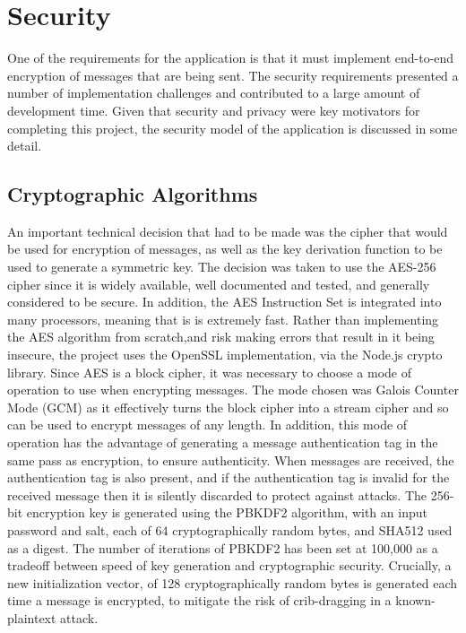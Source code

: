 \section{Security}
One of the requirements for the application is that it must implement end-to-end encryption of messages that are being sent. The security requirements presented a number of implementation challenges and contributed to a large amount of development time. Given that security and privacy were key motivators for completing this project, the security model of the application is discussed in some detail.

\subsection{Cryptographic Algorithms}
An important technical decision that had to be made was the cipher that would be used for encryption of messages, as well as the key derivation function to be used to generate a symmetric key. The decision was taken to use the AES-256 cipher since it is widely available, well documented and tested, and generally considered to be secure. In addition, the AES Instruction Set is integrated into many processors, meaning that is is extremely fast. Rather than implementing the AES algorithm from scratch,and risk making errors that result in it being insecure, the project uses the OpenSSL implementation, via the Node.js crypto library. Since AES is a block cipher, it was necessary to choose a mode of operation to use when encrypting messages. The mode chosen was Galois Counter Mode (GCM) as it effectively turns the block cipher into a stream cipher and so can be used to encrypt messages of any length. In addition, this mode of operation has the advantage of generating a message authentication tag in the same pass as encryption, to ensure authenticity. When messages are received, the authentication tag is also present, and if the authentication tag is invalid for the received message then it is silently discarded to protect against attacks. The 256-bit encryption key is generated using the PBKDF2 algorithm, with an input password and salt, each of 64 cryptographically random bytes, and SHA512 used as a digest. The number of iterations of PBKDF2 has been set at 100,000 as a tradeoff between speed of key generation and cryptographic security. Crucially, a new initialization vector, of 128 cryptographically random bytes is generated each time a message is encrypted, to mitigate the risk of crib-dragging in a known-plaintext attack.

